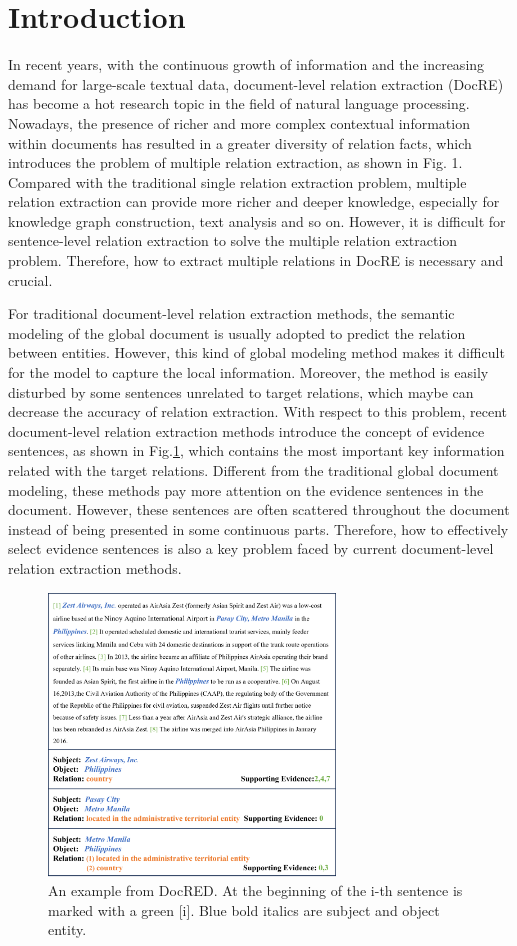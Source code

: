 \documentclass[preprint,12pt]{elsarticle}
\begin{document}
\section{Introduction}
\label{introduction}
In recent years, with the continuous growth of information and the increasing demand for large-scale textual data, document-level relation extraction (DocRE) has become a hot research topic in the field of natural language processing\cite{chen2023dialogue, wei2302zero}. Nowadays, the presence of richer and more complex contextual information within documents has resulted in a greater diversity of relation facts, which introduces the problem of multiple relation extraction, as shown in Fig. 1. Compared with the traditional single relation extraction problem, multiple relation extraction can provide more richer and deeper knowledge, especially for knowledge graph construction, text analysis and so on. However, it is difficult for sentence-level relation extraction\cite{zheng2023sentence,zhang2023rdrs,baek2022enhancing,park4272160effective} to solve the multiple relation extraction problem. Therefore, how to extract multiple relations in DocRE is necessary and crucial.

For traditional document-level relation extraction methods, the semantic modeling of the global document is usually adopted to predict the relation between entities. However, this kind of global modeling method makes it difficult for the model to capture the local information. Moreover, the method is easily disturbed by some sentences unrelated to target relations, which maybe can decrease the accuracy of relation extraction. With respect to this problem, recent document-level relation extraction methods introduce the concept of evidence sentences, as shown in Fig.\ref{fig.1}, which contains the most important key information related with the target relations. Different from the traditional global document modeling, these methods pay more attention on the evidence sentences in the document. However, these sentences are often scattered throughout the document instead of being presented in some continuous parts. Therefore, how to effectively select evidence sentences is also a key problem faced by current document-level relation extraction methods. 
\begin{figure}[htbp]
\centering
\includegraphics[width=3in]{./dataset.png}
\caption{An example from DocRED. At the beginning of the i-th sentence is marked with a green [i]. Blue bold italics are subject and object entity.}
\label{fig.1}
\end{figure}
\end{document}
